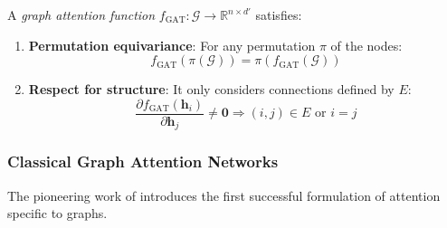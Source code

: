 \begin{definition}\label{def:graph_attention_function}
A \textit{graph attention function} $f_{\text{GAT}}: \mathcal{G} \to \mathbb{R}^{n \times d'}$ satisfies:
\begin{enumerate}
    \item \textbf{Permutation equivariance}: For any permutation $\pi$ of the nodes:
    \begin{equation}
        f_{\text{GAT}}(\pi(\mathcal{G})) = \pi(f_{\text{GAT}}(\mathcal{G}))
        \label{eq:gat_permutation_equivariance}
    \end{equation}

    \item \textbf{Respect for structure}: It only considers connections defined by $E$:
    \begin{equation}
        \frac{\partial f_{\text{GAT}}(\mathbf{h}_i)}{\partial \mathbf{h}_j} \neq \mathbf{0} \Rightarrow (i,j) \in E \text{ or } i = j
        \label{eq:gat_structural_constraint}
    \end{equation}
\end{enumerate}
\end{definition}

\subsubsection{Classical Graph Attention Networks}\label{subsubsec:gat_clasicos}

The pioneering work of \citet{velickovic2017graph} introduces the first successful formulation of attention specific to graphs.

